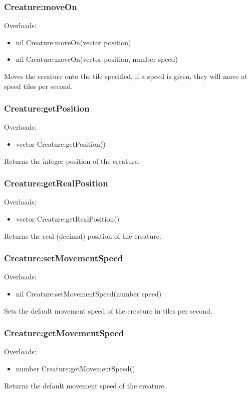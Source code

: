 \documentclass{book}
\newenvironment{ulist}
	{\begin{itemize}
			\itemsep0em}
	{\end{itemize}}
\begin{document}
\subsubsection{Creature:moveOn}
Overloads:
\begin{ulist}
	\item nil Creature:moveOn(vector position)
	\item nil Creature:moveOn(vector position, number speed)
\end{ulist}
Moves the creature onto the tile specified, if a speed is given, they will move at speed tiles per second.

\subsubsection{Creature:getPosition}
Overloads:
\begin{ulist}
	\item vector Creature:getPosition()
\end{ulist}
Returns the integer position of the creature.

\subsubsection{Creature:getRealPosition}
Overloads:
\begin{ulist}
	\item vector Creature:getRealPosition()
\end{ulist}
Returns the real (decimal) position of the creature.

\subsubsection{Creature:setMovementSpeed}
Overloads:
\begin{ulist}
	\item nil Creature:setMovementSpeed(number speed)
\end{ulist}
Sets the default movement speed of the creature in tiles per second.

\subsubsection{Creature:getMovementSpeed}
Overloads:
\begin{ulist}
	\item number Creature:getMovementSpeed()
\end{ulist}
Returns the default movement speed of the creature.
\end{document}
